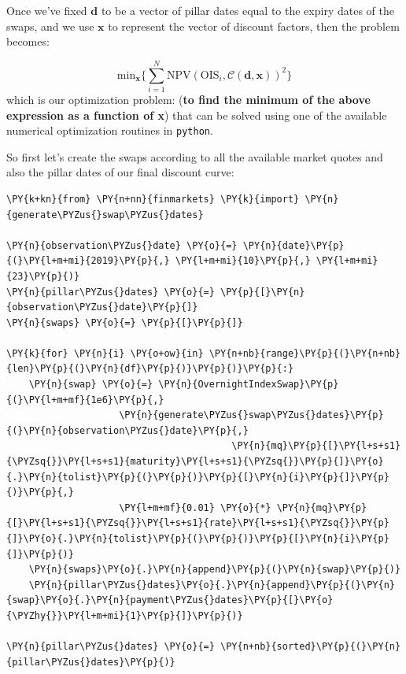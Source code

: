 Once we've fixed \(\mathbf{d}\) to be a vector of pillar dates equal to the expiry dates of the swaps, and we use \(\mathbf{x}\) to represent the vector of discount factors, then the problem becomes:

\begin{equation}
\mathrm{min}_{\mathbf{x}} \Big\{\sum_{i=1}^{N}\mathrm{NPV}(\mathrm{OIS}_i, \mathcal{C}(\mathbf{d}, \mathbf{x}))^2\Big\}
\end{equation}
which is our optimization problem: (\textbf{to find the minimum of the above expression as a function of x}) that can be solved using one of the available numerical optimization routines 
in \texttt{python}.

So first let's create the swaps according to all the available market
quotes and also the pillar dates of our final discount curve:

\begin{codebox}
\begin{Verbatim}[commandchars=\\\{\}]
\PY{k+kn}{from} \PY{n+nn}{finmarkets} \PY{k}{import} \PY{n}{generate\PYZus{}swap\PYZus{}dates}

\PY{n}{observation\PYZus{}date} \PY{o}{=} \PY{n}{date}\PY{p}{(}\PY{l+m+mi}{2019}\PY{p}{,} \PY{l+m+mi}{10}\PY{p}{,} \PY{l+m+mi}{23}\PY{p}{)}
\PY{n}{pillar\PYZus{}dates} \PY{o}{=} \PY{p}{[}\PY{n}{observation\PYZus{}date}\PY{p}{]}
\PY{n}{swaps} \PY{o}{=} \PY{p}{[}\PY{p}{]} 

\PY{k}{for} \PY{n}{i} \PY{o+ow}{in} \PY{n+nb}{range}\PY{p}{(}\PY{n+nb}{len}\PY{p}{(}\PY{n}{df}\PY{p}{)}\PY{p}{)}\PY{p}{:}
    \PY{n}{swap} \PY{o}{=} \PY{n}{OvernightIndexSwap}\PY{p}{(}\PY{l+m+mf}{1e6}\PY{p}{,}
                    \PY{n}{generate\PYZus{}swap\PYZus{}dates}\PY{p}{(}\PY{n}{observation\PYZus{}date}\PY{p}{,}  
                                        \PY{n}{mq}\PY{p}{[}\PY{l+s+s1}{\PYZsq{}}\PY{l+s+s1}{maturity}\PY{l+s+s1}{\PYZsq{}}\PY{p}{]}\PY{o}{.}\PY{n}{tolist}\PY{p}{(}\PY{p}{)}\PY{p}{[}\PY{n}{i}\PY{p}{]}\PY{p}{)}\PY{p}{,}
                    \PY{l+m+mf}{0.01} \PY{o}{*} \PY{n}{mq}\PY{p}{[}\PY{l+s+s1}{\PYZsq{}}\PY{l+s+s1}{rate}\PY{l+s+s1}{\PYZsq{}}\PY{p}{]}\PY{o}{.}\PY{n}{tolist}\PY{p}{(}\PY{p}{)}\PY{p}{[}\PY{n}{i}\PY{p}{]}\PY{p}{)}
    \PY{n}{swaps}\PY{o}{.}\PY{n}{append}\PY{p}{(}\PY{n}{swap}\PY{p}{)}
    \PY{n}{pillar\PYZus{}dates}\PY{o}{.}\PY{n}{append}\PY{p}{(}\PY{n}{swap}\PY{o}{.}\PY{n}{payment\PYZus{}dates}\PY{p}{[}\PY{o}{\PYZhy{}}\PY{l+m+mi}{1}\PY{p}{]}\PY{p}{)}

\PY{n}{pillar\PYZus{}dates} \PY{o}{=} \PY{n+nb}{sorted}\PY{p}{(}\PY{n}{pillar\PYZus{}dates}\PY{p}{)}
\end{Verbatim}
\end{codebox}

